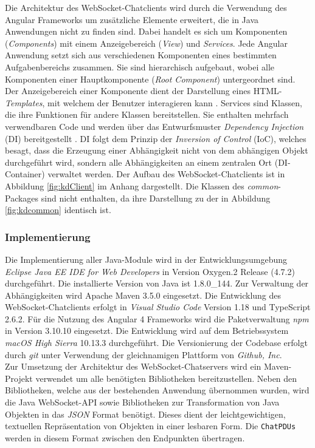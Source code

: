 \documentclass[11pt,a4paper,titlepage]{scrartcl}
\numberwithin{equation}{section}
\begin{document}
\noindent Die Architektur des WebSocket-Chatclients wird durch die Verwendung des Angular Frameworks um zusätzliche Elemente erweitert, die in Java Anwendungen nicht zu finden sind. Dabei handelt es sich um Komponenten (\textit{Components}) mit einem Anzeigebereich (\textit{View}) und \textit{Services}. Jede Angular Anwendung setzt sich aus verschiedenen Komponenten eines bestimmten Aufgabenbereichs zusammen. Sie sind hierarchisch aufgebaut, wobei alle Komponenten einer Hauptkomponente (\textit{Root Component}) untergeordnet sind. Der Anzeigebereich einer Komponente dient der Darstellung eines HTML-\textit{Templates}, mit welchem der Benutzer interagieren kann \autocite[66]{woiwode_angular_2017}. Services sind Klassen, die ihre Funktionen für andere Klassen bereitstellen. Sie enthalten mehrfach verwendbaren Code und werden über das Entwurfsmuster \textit{Dependency Injection} (DI) bereitgestellt \autocite[117]{woiwode_angular_2017}. DI folgt dem Prinzip der \textit{Inversion of Control} (IoC), welches besagt, dass die Erzeugung einer Abhängigkeit nicht von dem abhängigen Objekt durchgeführt wird, sondern alle Abhängigkeiten an einem zentralen Ort (DI-Container) verwaltet werden. Der Aufbau des WebSocket-Chatclients ist in Abbildung \ref{fig:kdClient} im Anhang dargestellt. Die Klassen des \textit{common}-Packages sind nicht enthalten, da ihre Darstellung zu der in Abbildung \ref{fig:kdcommon} identisch ist.

\subsubsection{Implementierung}
Die Implementierung aller Java-Module wird in der Entwicklungsumgebung \textit{Eclipse Java EE IDE for Web Developers} in Version Oxygen.2 Release (4.7.2) durchgeführt. Die installierte Version von Java ist 1.8.0\_144. Zur Verwaltung der Abhängigkeiten wird Apache Maven 3.5.0 eingesetzt. Die Entwicklung des WebSocket-Chatclients erfolgt in \textit{Visual Studio Code} Version 1.18 und TypeScript 2.6.2. Für die Nutzung des Angular 4 Frameworks wird die Paketverwaltung \textit{npm} in Version 3.10.10 eingesetzt. Die Entwicklung wird auf dem Betriebssystem \textit{macOS High Sierra} 10.13.3 durchgeführt. Die Versionierung der Codebase erfolgt durch \textit{git} unter Verwendung der gleichnamigen Plattform von \textit{Github, Inc}. \\

\noindent Zur Umsetzung der Architektur des WebSocket-Chatservers wird ein Maven-Projekt verwendet um alle benötigten Bibliotheken bereitzustellen. Neben den Bibliotheken, welche aus der bestehenden Anwendung übernommen wurden, wird die Java WebSocket-API sowie Bibliotheken zur Transformation von Java Objekten in das \textit{JSON} Format benötigt. Dieses dient der leichtgewichtigen, textuellen Repräsentation von Objekten in einer lesbaren Form. Die \texttt{ChatPDUs} werden in diesem Format zwischen den Endpunkten übertragen.\medskip
\end{document}
